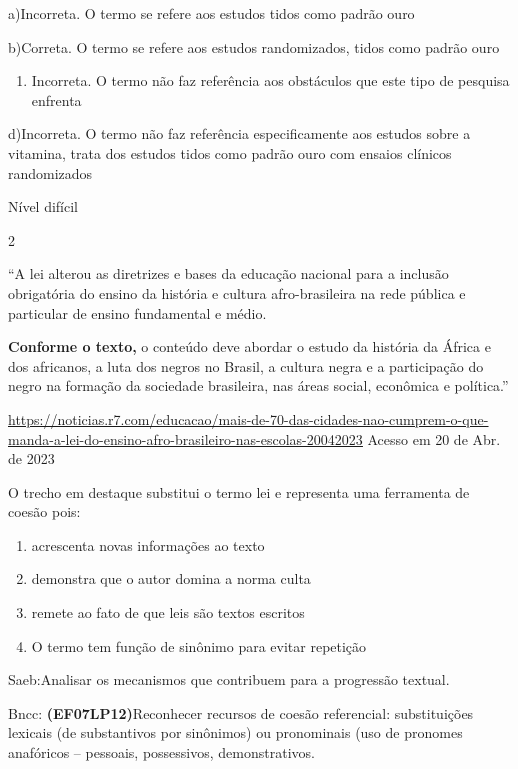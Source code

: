 {{a)Incorreta. O termo se refere aos estudos tidos como padrão ouro

b)Correta. O termo se refere aos estudos randomizados, tidos como padrão
ouro

\begin{enumerate}
\def\labelenumi{\arabic{enumi}.}
\tightlist
\item
  Incorreta. O termo não faz referência aos obstáculos que este tipo de
  pesquisa enfrenta
\end{enumerate}

d)Incorreta. O termo não faz referência especificamente aos estudos
sobre a vitamina, trata dos estudos tidos como padrão ouro com ensaios
clínicos randomizados

Nível difícil

\num{2}

``A lei alterou as diretrizes e bases da educação nacional para a
inclusão obrigatória do ensino da história e cultura afro-brasileira na
rede pública e particular de ensino fundamental e médio.

\textbf{Conforme o texto,} o conteúdo deve abordar o estudo da história
da África e dos africanos, a luta dos negros no Brasil, a cultura negra
e a participação do negro na formação da sociedade brasileira, nas áreas
social, econômica e política.''

\href{https://noticias.r7.com/educacao/mais-de-70-das-cidades-nao-cumprem-o-que-manda-a-lei-do-ensino-afro-brasileiro-nas-escolas-20042023}{\uline{https://noticias.r7.com/educacao/mais-de-70-das-cidades-nao-cumprem-o-que-manda-a-lei-do-ensino-afro-brasileiro-nas-escolas-20042023}}
Acesso em 20 de Abr. de 2023

O trecho em destaque substitui o termo lei e representa uma ferramenta
de coesão pois:

\begin{enumerate}
\def\labelenumi{\alph{enumi})}
\item
  acrescenta novas informações ao texto
\item
  demonstra que o autor domina a norma culta
\item
  remete ao fato de que leis são textos escritos
\item
  O termo tem função de sinônimo para evitar repetição
\end{enumerate}

Saeb:Analisar os mecanismos que contribuem para a progressão textual.

Bncc: \textbf{(EF07LP12)}Reconhecer recursos de coesão referencial:
substituições lexicais (de substantivos por sinônimos) ou pronominais
(uso de pronomes anafóricos -- pessoais, possessivos, demonstrativos.

}}
